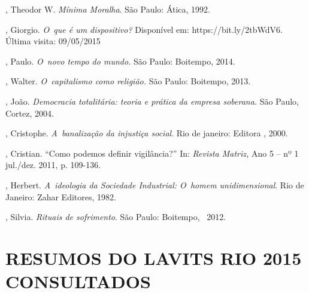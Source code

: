\begin{Parskip}
, Theodor W. \emph{Mínima Moralha}. São Paulo: Ática, 1992.

, Giorgio. \emph{O~que é um dispositivo?} Disponível em:
https://bit.ly/2tbWdV6. Última
visita: 09/05/2015

, Paulo. \emph{O~novo tempo do mundo.} São Paulo: Boitempo, 2014.

, Walter. \emph{O~capitalismo como religião.} São Paulo:
Boitempo, 2013.

, João. \emph{Democracia totalitária: teoria e prática da
empresa soberana.} São Paulo, Cortez, 2004.

, Cristophe. \emph{A~banalização da injustiça social}. Rio de
janeiro: Editora , 2000.

, Cristian. ``Como podemos definir vigilância?'' In: \emph{Revista
Matriz,} Ano 5 -- nº 1 jul./dez. 2011, p. 109-136. ~

, Herbert. \emph{A~ideologia da Sociedade Industrial: O~homem
unidimensional}. Rio de Janeiro: Zahar Editores, 1982.

, Silvia. \emph{Rituais de sofrimento}. São Paulo: Boitempo, ~2012.
\end{Parskip}

\section{RESUMOS DO LAVITS RIO 2015 CONSULTADOS}

